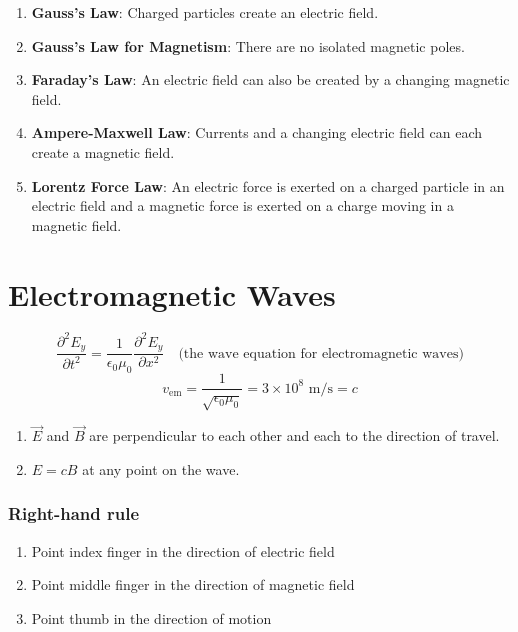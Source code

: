 \documentclass{article}
\begin{document}
\begin{enumerate}
    \item \textbf{Gauss's Law}: Charged particles create an electric field.
    \item \textbf{Gauss's Law for Magnetism}: There are no isolated magnetic poles.
    \item \textbf{Faraday's Law}: An electric field can also be created by a changing magnetic
    field.
    \item \textbf{Ampere-Maxwell Law}: Currents and a changing electric field can each create a
    magnetic field.
    \item \textbf{Lorentz Force Law}: An electric force is exerted on a charged particle in an
    electric field and a magnetic force is exerted on a charge moving in a magnetic field.
\end{enumerate}

\section*{Electromagnetic Waves}
\[\frac{\partial^2 E_y}{\partial t^2}=\frac{1}{\epsilon_0 \mu_0} \frac{\partial^2 E_y}
{\partial x^2}\quad\text{(the wave equation for electromagnetic waves)}\]
\[v_\text{em}=\frac{1}{\sqrt{\epsilon_0 \mu_0}} = 3\times 10^8 \text{ m/s} = c\]

\begin{enumerate}
    \item $\vec{E}$ and $\vec{B}$ are perpendicular to each other and each to the direction of
    travel.
    \item $E=cB$ at any point on the wave.
\end{enumerate}

\subsubsection*{Right-hand rule}
\begin{enumerate}
    \item Point index finger in the direction of electric field
    \item Point middle finger in the direction of magnetic field
    \item Point thumb in the direction of motion
\end{enumerate}
\end{document}
